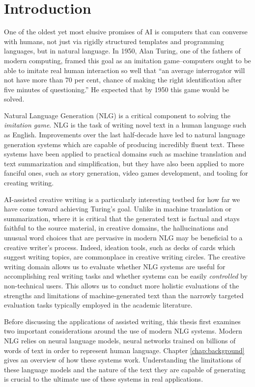 \chapter{Introduction} \label{chap:intro}

One of the oldest yet most elusive promises of AI is computers that can converse with humans, not just via rigidly structured templates and programming languages, but in natural language.
In 1950, Alan Turing, one of the fathers of modern computing, framed this goal as an imitation game--computers ought to be able to imitate real human interaction so well that ``an average interrogator will not have more than 70 per cent, chance of making the right identification after five minutes of questioning.''
He expected that by 1950 this game would be solved.

Natural Language Generation (NLG) is a critical component to solving the \textit{imitation game}.
NLG is the task of writing novel text in a human language such as English. 
Improvements over the last half-decade have led to natural language generation systems which are capable of producing incredibly fluent text.
These systems have been applied to practical domains such as machine translation and text summarization and simplification, but they have also been applied to more fanciful ones, such as story generation, video games development, and tooling for creating writing.

AI-assisted creative writing is a particularly interesting testbed for how far we have come toward achieving Turing's goal.
Unlike in machine translation or summarization, where it is critical that the generated text is factual and stays faithful to the source material, in creative domains, the hallucinations and unusual word choices that are pervasive in modern NLG may be beneficial to a creative writer's process.
Indeed, ideation tools, such as decks of cards which suggest writing topics, are commonplace in creative writing circles.
The creative writing domain allows us to evaluate whether NLG systems are useful for accomplishing real writing tasks and whether systems can be easily \textit{controlled} by non-technical users.
This allows us to conduct more holistic evaluations of the strengths and limitations of machine-generated text than the narrowly targeted evaluation tasks typically employed in the academic literature.

Before discussing the applications of assisted writing, this thesis first examines two important considerations around the use of modern NLG systems.
Modern NLG relies on neural language models, neural networks trained on billions of words of text in order to represent human language.
Chapter \ref{chap:background} gives an overview of how these systems work. 
Understanding the limitations of these language models and the nature of the text they are capable of generating is crucial to the ultimate use of these systems in real applications.

